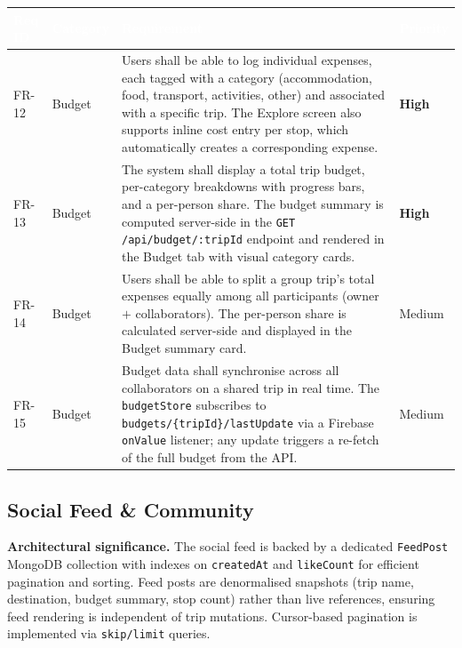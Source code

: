 \documentclass[12pt, a4paper]{article}
\newcommand{\reqid}[1]{\textsc{\small #1}}
\newcommand{\high}{\textbf{High}}
\newcommand{\medium}{Medium}
\newcommand{\thcell}[1]{\textcolor{white}{\textbf{\small #1}}}
\begin{document}
\vspace{0.4em}
\begin{longtable}{C{1.6cm} C{2.0cm} L{8.2cm} C{1.8cm}}
\toprule
{}
\thcell{Req ID} & \thcell{Category} & \thcell{Requirement} & \thcell{Priority} \\
\midrule
\endhead
\bottomrule
\endfoot

\reqid{FR-12} & Budget &
Users shall be able to log individual expenses, each tagged with a category (accommodation, food, transport, activities, other) and associated with a specific trip. The Explore screen also supports inline cost entry per stop, which automatically creates a corresponding expense. &
\high \\

\reqid{FR-13} & Budget &
The system shall display a total trip budget, per-category breakdowns with progress bars, and a per-person share. The budget summary is computed server-side in the \texttt{GET /api/budget/:tripId} endpoint and rendered in the Budget tab with visual category cards. &
\high \\

\reqid{FR-14} & Budget &
Users shall be able to split a group trip's total expenses equally among all participants (owner $+$ collaborators). The per-person share is calculated server-side and displayed in the Budget summary card. &
\medium \\

\reqid{FR-15} & Budget &
Budget data shall synchronise across all collaborators on a shared trip in real time. The \texttt{budgetStore} subscribes to \texttt{budgets/\{tripId\}/lastUpdate} via a Firebase \texttt{onValue} listener; any update triggers a re-fetch of the full budget from the API. &
\medium \\

\end{longtable}

\subsection{Social Feed \& Community}

\begin{tcolorbox}[notebox]
  \textbf{Architectural significance.} The social feed is backed by a dedicated \texttt{FeedPost} MongoDB collection with indexes on \texttt{createdAt} and \texttt{likeCount} for efficient pagination and sorting. Feed posts are denormalised snapshots (trip name, destination, budget summary, stop count) rather than live references, ensuring feed rendering is independent of trip mutations. Cursor-based pagination is implemented via \texttt{skip/limit} queries.
\end{tcolorbox}
\end{document}
